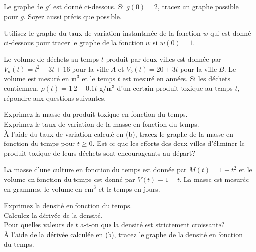 \begin{question}
Le graphe de $g'$ est donné ci-dessous.
Si $g(0)= 2$, tracez un graphe possible pour $g$.  Soyez aussi précis que
possible.
\label{6Q10}
\end{question}

\begin{question}
Utilisez le graphe du taux de variation instantanée de la fonction $w$
qui est donné ci-dessous pour tracer le graphe de la fonction $w$ si $w(0)=1$.
\label{6Q11}
\end{question}

\begin{question}[\life]
Le volume de déchets au temps $t$ produit par deux villes est donnée
par $\displaystyle V_a(t) = t^2 - 3t + 16$ pour la ville $A$ et
$V_b(t) = 20 + 3t$ pour la ville $B$.  Le volume est mesuré en m$^3$
et le temps $t$ est mesuré en années.  Si les déchets contiennent
$\rho(t) = 1.2 - 0.1 t$ g/m$^3$ d'un certain produit toxique au temps
$t$, répondre aux questions suivantes.

 Exprimez la masse du produit toxique en fonction du temps.\\
 Exprimez le taux de variation de la masse en fonction du temps.\\
 À l'aide du taux de variation calculé en (b), tracez le
graphe de la masse en fonction du temps pour $t\geq 0$.  Est-ce que
les efforts des deux villes d'éliminer le produit toxique de leurs
déchets sont encourageants au départ?
\label{6Q12}
\end{question}

\begin{question}[\life]
La masse d'une culture en fonction du temps est donnée par
$M(t) = 1 + t^2$ et le volume en fonction du temps est donné par
$V(t) = 1+t$.  La masse est mesurée en grammes, le volume en cm$^3$ et le
temps en jours.

 Exprimez la densité en fonction du temps.\\
 Calculez la dérivée de la densité.\\
 Pour quelles valeurs de $t$ a-t-on que la densité est
strictement croissante?\\
 À l'aide de la dérivée calculée en (b), tracez le graphe de
la densité en fonction du temps.
\label{6Q13}
\end{question}

